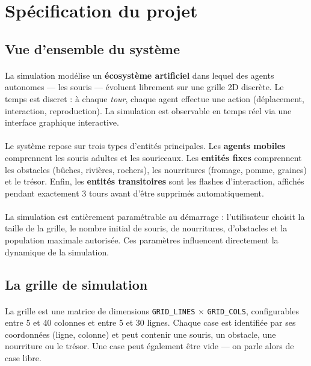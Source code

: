 \section{Spécification du projet}
\label{sec:spec}

\subsection{Vue d'ensemble du système}

\paragraph{} La simulation modélise un \textbf{écosystème artificiel} dans lequel des agents autonomes --- les souris --- évoluent librement sur une grille 2D discrète. Le temps est discret : à chaque \textit{tour}, chaque agent effectue une action (déplacement, interaction, reproduction). La simulation est observable en temps réel via une interface graphique interactive.

\paragraph{} Le système repose sur trois types d'entités principales. Les \textbf{agents mobiles} comprennent les souris adultes et les souriceaux. Les \textbf{entités fixes} comprennent les obstacles (bûches, rivières, rochers), les nourritures (fromage, pomme, graines) et le trésor. Enfin, les \textbf{entités transitoires} sont les flashes d'interaction, affichés pendant exactement 3 tours avant d'être supprimés automatiquement.

\paragraph{} La simulation est entièrement paramétrable au démarrage : l'utilisateur choisit la taille de la grille, le nombre initial de souris, de nourritures, d'obstacles et la population maximale autorisée. Ces paramètres influencent directement la dynamique de la simulation.

\bigskip

\subsection{La grille de simulation}

\paragraph{} La grille est une matrice de dimensions \texttt{GRID\_LINES} $\times$ \texttt{GRID\_COLS}, configurables entre 5 et 40 colonnes et entre 5 et 30 lignes. Chaque case est identifiée par ses coordonnées (ligne, colonne) et peut contenir une souris, un obstacle, une nourriture ou le trésor. Une case peut également être vide --- on parle alors de case libre.

